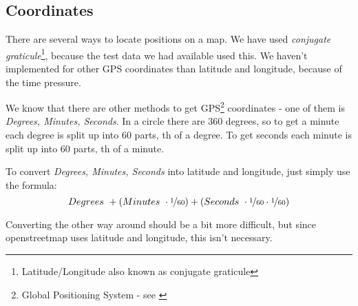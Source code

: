 \subsection{Coordinates}
There are several ways to locate positions on a map. We have used \emph{conjugate graticule}\footnote{Latitude/Longitude also known as conjugate graticule}, because the test data we had available used this. We haven't implemented for other GPS coordinates than latitude and longitude, because of the time pressure.

We know that there are other methods to get GPS\footnote{Global Positioning System - see \cite{GPS}} coordinates - one of them is \emph{Degrees, Minutes, Seconds}. In a circle there are 360 degrees, so to get a minute each degree is split up into 60 parts, th of a degree. To get seconds each minute is split up into 60 parts, th of a minute.

To convert \emph{Degrees, Minutes, Seconds} into latitude and longitude, just simply use the formula:
\begin{equation}
Degrees~ + \left(Minutes~ \cdot \nicefrac{1}{60}\right) + \left(Seconds~ \cdot \nicefrac{1}{60} \cdot \nicefrac{1}{60}\right)
\end{equation}

Converting the other way around should be a bit more difficult, but since openstreetmap uses latitude and longitude, this isn't necessary.

